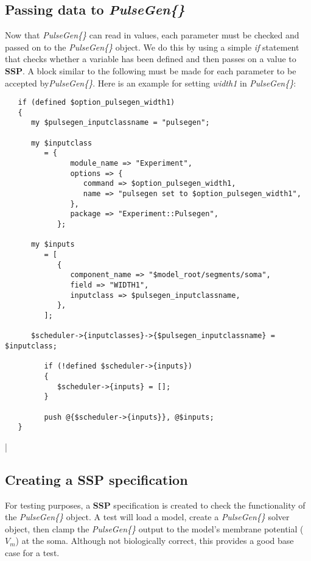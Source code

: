 \documentclass[12pt]{article}
\begin{document}
\subsection*{Passing data to {\it PulseGen\{\}}}

Now that {\it PulseGen\{\}} can read in values, each parameter must be checked and passed on to the {\it PulseGen\{\}} object. We do this by using a simple {\it if} statement that checks whether a variable has been defined and then passes on a value to {\bf SSP}. A block similar to the following must be made for each parameter to be accepted by{\it PulseGen\{\}}. Here is an example for setting {\it width1} in {\it PulseGen\{\}}:
\begin{verbatim}
   if (defined $option_pulsegen_width1)
   {
      my $pulsegen_inputclassname = "pulsegen";

      my $inputclass
         = {
               module_name => "Experiment",
               options => {
                  command => $option_pulsegen_width1,
                  name => "pulsegen set to $option_pulsegen_width1",
               },
               package => "Experiment::Pulsegen",
            };

      my $inputs
         = [
            {
               component_name => "$model_root/segments/soma",
               field => "WIDTH1",
               inputclass => $pulsegen_inputclassname,
            },
         ];

      $scheduler->{inputclasses}->{$pulsegen_inputclassname} = $inputclass;

         if (!defined $scheduler->{inputs})
         {
            $scheduler->{inputs} = [];
         }

         push @{$scheduler->{inputs}}, @$inputs;
   }
\end{verbatim}

|\subsection*{Creating a SSP specification}

For testing purposes, a {\bf SSP} specification is created to check the functionality of the {\it PulseGen\{\}} object. A test will load a model, create a {\it PulseGen\{\}} solver object, then clamp the {\it PulseGen\{\}} output to the model's membrane potential ($V_m$) at the soma. Although not biologically correct, this provides a good base case for a test.
\end{document}
